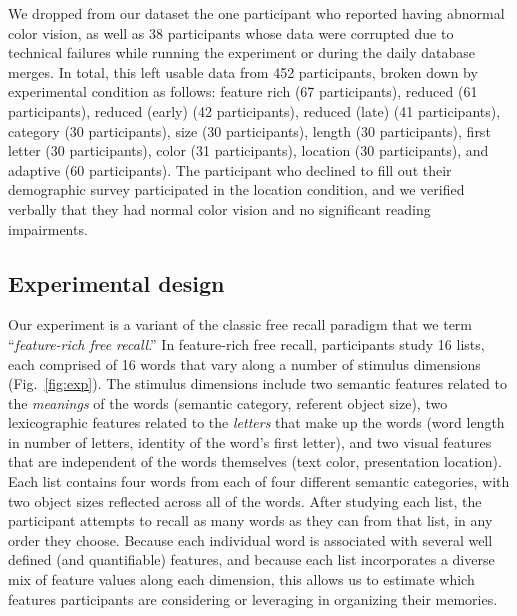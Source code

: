 \documentclass[11pt]{article}
\begin{document}
We dropped from our dataset the one participant who reported having abnormal
color vision, as well as 38 participants whose data were corrupted due to
technical failures while running the experiment or during the daily database
merges. In total, this left usable data from 452 participants, broken down by
experimental condition as follows: feature rich (67 participants), reduced (61
participants), reduced (early) (42 participants), reduced (late) (41
participants), category (30 participants), size (30 participants), length (30
participants), first letter (30 participants), color (31 participants),
location (30 participants), and adaptive (60 participants). The participant who
declined to fill out their demographic survey participated in the location
condition, and we verified verbally that they had normal color vision and no
significant reading impairments.




\subsection*{Experimental design}

Our experiment is a variant of the classic free recall paradigm that we term
``\textit{feature-rich free recall}.'' In feature-rich free recall,
participants study 16 lists, each comprised of 16 words that vary along a
number of stimulus dimensions (Fig.~\ref{fig:exp}). The stimulus dimensions
include two semantic features related to the \textit{meanings} of the words
(semantic category, referent object size), two lexicographic features related
to the \textit{letters} that make up the words (word length in number of
letters, identity of the word's first letter), and two visual features that are
independent of the words themselves (text color, presentation location). Each
list contains four words from each of four different semantic categories, with
two object sizes reflected across all of the words. After studying each list,
the participant attempts to recall as many words as they can from that list, in
any order they choose. Because each individual word is associated with several
well defined (and quantifiable) features, and because each list incorporates a
diverse mix of feature values along each dimension, this allows us to estimate
which features participants are considering or leveraging in organizing their
memories.
\end{document}
